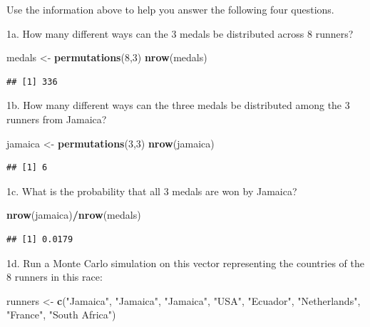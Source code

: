 \documentclass[
]{article}
\newenvironment{Shaded}{\begin{snugshade}}{\end{snugshade}}
\newcommand{\DecValTok}[1]{\textcolor[rgb]{0.00,0.00,0.81}{#1}}
\newcommand{\KeywordTok}[1]{\textcolor[rgb]{0.13,0.29,0.53}{\textbf{#1}}}
\newcommand{\NormalTok}[1]{#1}
\newcommand{\OperatorTok}[1]{\textcolor[rgb]{0.81,0.36,0.00}{\textbf{#1}}}
\newcommand{\StringTok}[1]{\textcolor[rgb]{0.31,0.60,0.02}{#1}}
\begin{document}
Use the information above to help you answer the following four
questions.

1a. How many different ways can the 3 medals be distributed across 8
runners?

\begin{Shaded}
\begin{Highlighting}[]
\NormalTok{medals \textless{}{-}}\StringTok{ }\KeywordTok{permutations}\NormalTok{(}\DecValTok{8}\NormalTok{,}\DecValTok{3}\NormalTok{)}
\KeywordTok{nrow}\NormalTok{(medals)}
\end{Highlighting}
\end{Shaded}

\begin{verbatim}
## [1] 336
\end{verbatim}

1b. How many different ways can the three medals be distributed among
the 3 runners from Jamaica?

\begin{Shaded}
\begin{Highlighting}[]
\NormalTok{jamaica \textless{}{-}}\StringTok{ }\KeywordTok{permutations}\NormalTok{(}\DecValTok{3}\NormalTok{,}\DecValTok{3}\NormalTok{)}
\KeywordTok{nrow}\NormalTok{(jamaica)}
\end{Highlighting}
\end{Shaded}

\begin{verbatim}
## [1] 6
\end{verbatim}

1c. What is the probability that all 3 medals are won by Jamaica?

\begin{Shaded}
\begin{Highlighting}[]
\KeywordTok{nrow}\NormalTok{(jamaica)}\OperatorTok{/}\KeywordTok{nrow}\NormalTok{(medals)}
\end{Highlighting}
\end{Shaded}

\begin{verbatim}
## [1] 0.0179
\end{verbatim}

1d. Run a Monte Carlo simulation on this vector representing the
countries of the 8 runners in this race:

\begin{Shaded}
\begin{Highlighting}[]
\NormalTok{runners \textless{}{-}}\StringTok{ }\KeywordTok{c}\NormalTok{(}\StringTok{"Jamaica"}\NormalTok{, }\StringTok{"Jamaica"}\NormalTok{, }\StringTok{"Jamaica"}\NormalTok{, }\StringTok{"USA"}\NormalTok{, }\StringTok{"Ecuador"}\NormalTok{, }\StringTok{"Netherlands"}\NormalTok{, }\StringTok{"France"}\NormalTok{, }\StringTok{"South Africa"}\NormalTok{)}
\end{Highlighting}
\end{Shaded}
\end{document}
